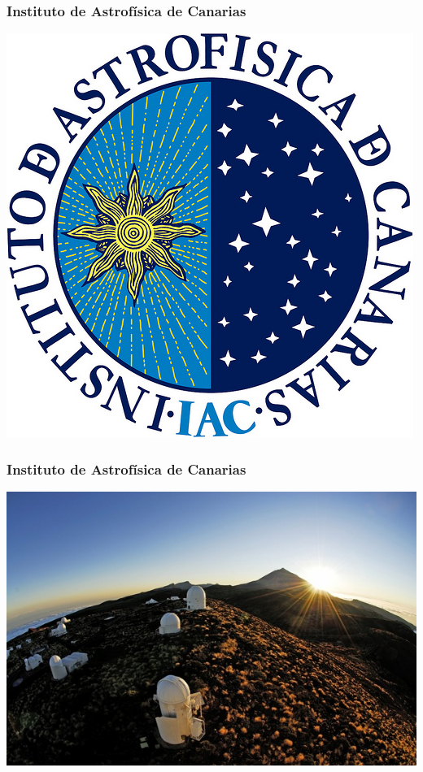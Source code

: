 
\begin{frame}
    \frametitle{Instituto de Astrofísica de Canarias}
    \endblock{}
		\begin{center}
    \includegraphics[width=0.5\linewidth]{FIGURES/logoIAC}
		\end{center}
\end{frame}

\begin{frame}
    \frametitle{Instituto de Astrofísica de Canarias}
    \endblock{}
		\begin{center}
    \includegraphics[width=0.7\linewidth]{FIGURES/IAC}
		\end{center}
\end{frame}

